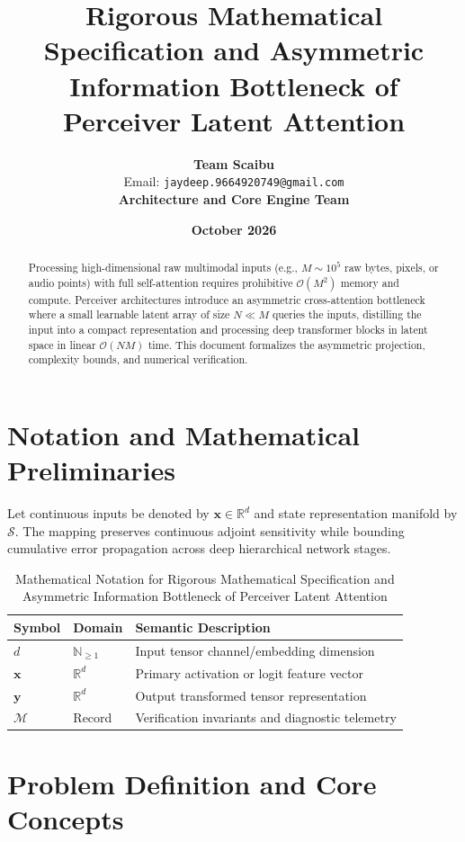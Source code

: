 \documentclass[11pt,a4paper]{article}
\title{\textbf{Rigorous Mathematical Specification and Asymmetric Information Bottleneck of Perceiver Latent Attention}}
\author{\textbf{Team Scaibu} \\ \small Email: \texttt{jaydeep.9664920749@gmail.com} \\ \small \textbf{Architecture and Core Engine Team}}
\date{\textbf{October 2026}}
\theoremstyle{definition}
\begin{document}
\maketitle

\begin{abstract}
Processing high-dimensional raw multimodal inputs (e.g., $M \sim 10^5$ raw bytes, pixels, or audio points) with full self-attention requires prohibitive $\mathcal{O}(M^2)$ memory and compute. Perceiver architectures introduce an asymmetric cross-attention bottleneck where a small learnable latent array of size $N \ll M$ queries the inputs, distilling the input into a compact representation and processing deep transformer blocks in latent space in linear $\mathcal{O}(NM)$ time. This document formalizes the asymmetric projection, complexity bounds, and numerical verification.
\end{abstract}

\section{Notation and Mathematical Preliminaries}

Let continuous inputs be denoted by $\mathbf{x} \in \mathbb{R}^d$ and state representation manifold by $\mathcal{S}$. The mapping preserves continuous adjoint sensitivity while bounding cumulative error propagation across deep hierarchical network stages.

\begin{table}[h]
\centering
\caption{Mathematical Notation for Rigorous Mathematical Specification and Asymmetric Information Bottleneck of Perceiver Latent Attention}
\begin{tabular}{lll}
\toprule
\textbf{Symbol} & \textbf{Domain} & \textbf{Semantic Description} \\
\midrule
$d$ & $\mathbb{N}_{\ge 1}$ & Input tensor channel/embedding dimension \\
$\mathbf{x}$ & $\mathbb{R}^d$ & Primary activation or logit feature vector \\
$\mathbf{y}$ & $\mathbb{R}^d$ & Output transformed tensor representation \\
$\mathcal{M}$ & Record & Verification invariants and diagnostic telemetry \\
\bottomrule
\end{tabular}
\end{table}

\section{Problem Definition and Core Concepts}
\end{document}
